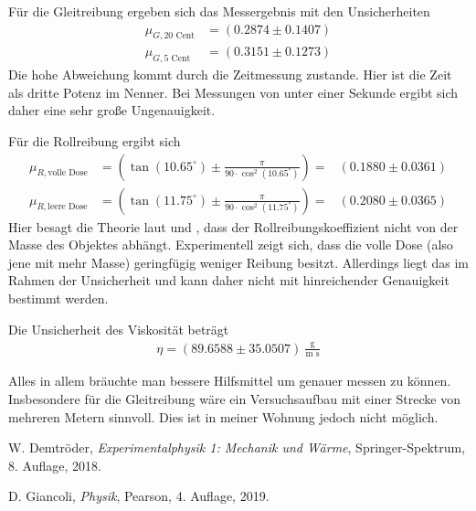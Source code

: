 \documentclass{article}
\begin{document}
Für die Gleitreibung ergeben sich das Messergebnis mit den Unsicherheiten
\begin{align}
\mu_{G,\text{20 Cent}} &= \left(0.2874 \pm 0.1407\right) \\
\mu_{G,\text{5 Cent}} &= \left(0.3151 \pm 0.1273\right)
\end{align}
Die hohe Abweichung kommt durch die Zeitmessung zustande. Hier ist die Zeit als dritte Potenz im Nenner. Bei Messungen von unter einer Sekunde ergibt sich daher eine sehr große Ungenauigkeit.

Für die Rollreibung ergibt sich
\begin{align}
\mu_{R,\text{volle Dose}} &= \left(\tan\left(10.65^\circ\right) \pm \frac{\pi}{90\cdot \cos^2\left(10.65^\circ\right)} \right) =& \left(0.1880 \pm 0.0361\right) \\
\mu_{R,\text{leere Dose}} &= \left(\tan\left(11.75^\circ\right) \pm \frac{\pi}{90\cdot \cos^2\left(11.75^\circ\right)} \right) =& \left(0.2080 \pm 0.0365\right)
\end{align}
Hier besagt die Theorie laut \cite{demtr1} und \cite{giancoli}, dass der Rollreibungskoeffizient nicht von der Masse des Objektes abhängt. Experimentell zeigt sich, dass die volle Dose (also jene mit mehr Masse) geringfügig weniger Reibung besitzt. Allerdings liegt das im Rahmen der Unsicherheit und kann daher nicht mit hinreichender Genauigkeit bestimmt werden. 

Die Unsicherheit des Viskosität beträgt
\begin{align}
\eta = (89.6588 \pm 35.0507)~\frac{\text{g}}{\text{m s}}
\end{align}


Alles in allem bräuchte man bessere Hilfsmittel um genauer messen zu können. Insbesondere für die Gleitreibung wäre ein Versuchsaufbau mit einer Strecke von mehreren Metern sinnvoll. Dies ist in meiner Wohnung jedoch nicht möglich.


\begin{thebibliography}{9}
 W. Demtröder, \emph{Experimentalphysik 1: Mechanik und Wärme}, Springer-Spektrum, 8. Auflage, 2018.

 D. Giancoli, \emph{Physik}, Pearson, 4. Auflage, 2019.

\end{thebibliography}
\end{document}
